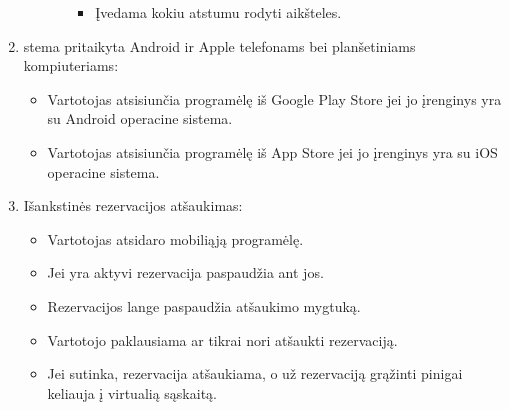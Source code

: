 \documentclass{VUMIFPSkursinis}
\begin{document}
\begin{enumerate}
\begin{itemize}
\begin{itemize}
						\begin{itemize}
							\item Įvedama kokiu atstumu rodyti aikšteles.
						\end{itemize}
				\end{itemize}
		\end{itemize}
	\item stema pritaikyta Android ir Apple telefonams bei planšetiniams kompiuteriams:
		\begin{itemize}
			\item Vartotojas atsisiunčia programėlę iš Google Play Store jei jo įrenginys yra su Android operacine sistema.
			\item Vartotojas atsisiunčia programėlę iš App Store jei jo įrenginys yra su iOS operacine sistema.
		\end{itemize}
	\item Išankstinės rezervacijos atšaukimas:
		\begin{itemize}
			\item Vartotojas atsidaro mobiliąją programėlę.
			\item Jei yra aktyvi rezervacija paspaudžia ant jos.
			\item Rezervacijos lange paspaudžia atšaukimo mygtuką.
			\item Vartotojo paklausiama ar tikrai nori atšaukti rezervaciją.
			\item Jei sutinka, rezervacija atšaukiama, o už rezervaciją grąžinti pinigai keliauja į virtualią sąskaitą.
		\end{itemize}		
\end{enumerate}
\end{document}
